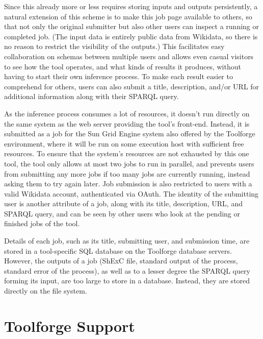 Since this already more or less requires storing inputs and outputs persistently,
a natural extension of this scheme is to make this job page available to others,
so that not only the original submitter but also other users can inspect a running or completed job.
(The input data is entirely public data from Wikidata,
so there is no reason to restrict the visibility of the outputs.)
This facilitates easy collaboration on schemas between multiple users
and allows even casual visitors to see how the tool operates,
and what kinds of results it produces,
without having to start their own inference process.
To make each result easier to comprehend for others,
users can also submit a title, description, and/or URL for additional information
along with their SPARQL query. %

As the inference process consumes a lot of resources,
it doesn’t run directly on the same system as the web server providing the tool’s front-end.
Instead, it is submitted as a job for the Sun Grid Engine system also offered by the Toolforge environment,
where it will be run on some execution host with sufficient free resources.
To ensure that the system’s resources are not exhausted by this one tool,
the tool only allows at most two jobs to run in parallel,
and prevents users from submitting any more jobs if too many jobs are currently running,
instead asking them to try again later.
Job submission is also restricted to users with a valid Wikidata account,
authenticated via OAuth.
The identity of the submitting user is another attribute of a job,
along with its title, description, URL, and SPARQL query,
and can be seen by other users who look at the pending or finished jobs of the tool.

Details of each job,
such as its title, submitting user, and submission time,
are stored in a tool-specific SQL database on the Toolforge database servers.
However, the outputs of a job
(ShExC file, standard output of the process, standard error of the process),
as well as to a lesser degree the SPARQL query forming its input,
are too large to store in a database.
Instead, they are stored directly on the file system.

\section{Toolforge Support}
\label{sec:wdsi:Toolforge}

